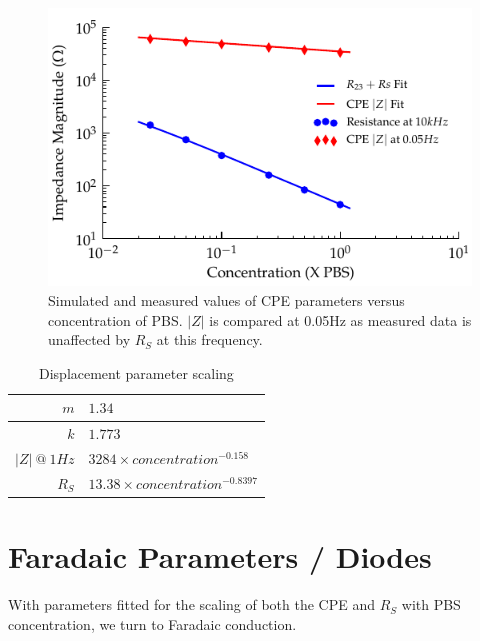 \documentclass[journal, a4paper]{IEEEtran}
\begin{document}
\begin{figure}
    \begin{center}
        \includegraphics{graphics/scalingFactors_Displacement_IEEE}
    \end{center}
    \caption{Simulated and measured values of CPE parameters versus concentration of PBS. $|Z|$ is compared at 0.05\thinspace Hz as measured data is unaffected by $R_{S}$ at this frequency.}
    \label{fig:CPE_Scaling}
\end{figure}

\begin{table}
    \begin{center}
        \begin{tabular}{|r|l|}
            \hline
            $m$ & $1.34$ \\ \hline
            $k$ & $1.773$\\ \hline
            $|Z|\: @\: 1Hz$& $3284 \times concentration^{-0.158}$ \\ \hline
            $R_{S}$ & $13.38 \times concentration^{-0.8397} $\\ \hline
        \end{tabular}
    \end{center}
    \caption{Displacement parameter scaling}
    \label{tab:CPEparams}
\end{table}



\section{Faradaic Parameters {\color{blue}/ Diodes}}
\label{sect:faradaic}

With parameters fitted for the scaling of both the CPE and $R_{S}$ with PBS concentration, we turn to Faradaic conduction.
\end{document}
